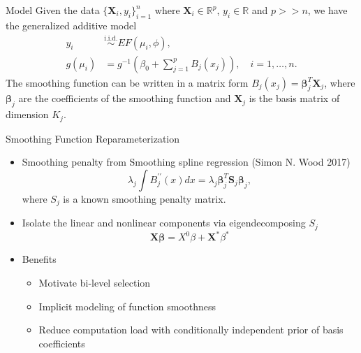 \documentclass[
  ignorenonframetext,
  aspectratio=169]{beamer}
\providecommand{\tightlist}{%
  \setlength{\itemsep}{0pt}\setlength{\parskip}{0pt}}
\newcommand{\bs}[1]{\boldsymbol{#1}}
\newcommand{\tp}{*}
\begin{document}
\begin{frame}{Model}
\protect\hypertarget{model}{}
Given the data \(\{\bm X_i, y_i\}_{i=1}^n\) where
\(\bm X_i \in \mathbb{R}^p\), \(y_i \in \mathbb{R}\) and \(p >> n\), we
have the generalized additive model \begin{align*}
y_i &\overset{\text{i.i.d.}}{\sim} EF(\mu_i, \phi),\\
g(\mu_i) &= g^{-1}(\beta_0 + \sum\limits^p_{j=1}B_j(x_j)) , \quad i = 1, \dots, n.
\end{align*} The smoothing function can be written in a matrix form
\(B_j(x_j) = \bs \beta_j^T \bs X_j\), where \(\bs \beta_j\) are the
coefficients of the smoothing function and \(\bs X_j\) is the basis
matrix of dimension \(K_j\).
\end{frame}

\begin{frame}{Smoothing Function Reparameterization}
\protect\hypertarget{smoothing-function-reparameterization}{}
\begin{itemize}
\item
  Smoothing penalty from Smoothing spline regression (Simon N. Wood
  2017) \[
  \lambda_j \int B^{\prime\prime}_j(x)dx = \lambda_j \bs \beta_j^T \bs S_j \bs \beta_j,
  \] where \(S_j\) is a known smoothing penalty matrix.
\item
  Isolate the linear and nonlinear components via eigendecomposing
  \(S_j\) \[\bm X \bm \beta = X^{0} \beta + \bs X^\tp\beta^\tp\]
\item
  Benefits

  \begin{itemize}
  \tightlist
  \item
    Motivate bi-level selection
  \item
    Implicit modeling of function smoothness
  \item
    Reduce computation load with conditionally independent prior of
    basis coefficients
  \end{itemize}
\end{itemize}
\end{frame}
\end{document}
